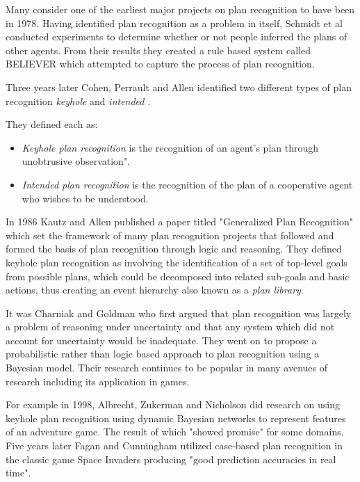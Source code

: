 \documentclass[parskip]{cs4rep}
\begin{document}
Many consider one of the earliest major projects on plan recognition to have been in 1978. Having identified plan recognition as a problem in itself, Schmidt et al \cite{journals/ai/SchmidtSG78} conducted experiments to determine whether or not people inferred the plans of other agents. From their results they created a rule based system called BELIEVER which attempted to capture the process of plan recognition. 

Three years later Cohen, Perrault and Allen identified two different types of plan recognition \textit{keyhole} and \textit{intended} \cite{Cohen82a}. 

They defined each as:

\begin{itemize}
\item
\textit{Keyhole plan recognition} is the recognition of an agent's plan through unobtrusive observation".
\item
\textit{Intended plan recognition} is the recognition of the plan of a cooperative agent who wishes to be understood.
\end{itemize}

In 1986 Kautz and Allen published a paper titled "Generalized Plan Recognition" \cite{conf/aaai/KautzA86} which set the framework of many plan recognition projects that followed and formed the basis of plan recognition through logic and reasoning. They defined keyhole plan recognition as involving the identification of a set of top-level goals from possible plans, which could be decomposed into related sub-goals and basic actions, thus creating an event hierarchy also known as a \textit{plan library}. 

It was Charniak and Goldman \cite{journals/ai/CharniakG93} who first argued that plan recognition was largely a problem of reasoning under uncertainty and that any system which did not account for uncertainty would be inadequate. They went on to propose a probabilistic rather than logic based approach to plan recognition using a Bayesian model. Their research continues to be popular in many avenues of research including its application in games.

For example in 1998, Albrecht, Zukerman and Nicholson \cite{Albrecht:1998:BMK:598277.598308} did research on using keyhole plan recognition using dynamic Bayesian networks to represent features of an adventure game. The result of which "showed promise" for some domains. Five years later Fagan and Cunningham utilized case-based plan recognition in the classic game Space Invaders \cite{Fagan03case-basedplan} producing "good prediction accuracies in real time".
\end{document}
